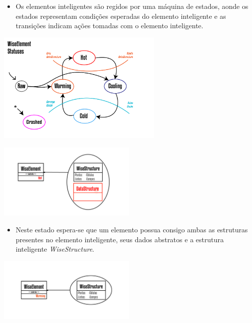\documentclass[10pt]{beamer}
\theoremstyle{remark}
\theoremstyle{definition}
\begin{document}
\begin{frame}[allowframebreaks]
		\framebreak
		
		\begin{itemize}
			\item Os elementos inteligentes são regidos por uma máquina de estados, aonde os estados representam condições esperadas do elemento inteligente e as transições indicam ações tomadas com o elemento inteligente.
		\end{itemize}
		
		\framebreak
		
		\begin{center}
			\includegraphics[width=0.6\textwidth]{images/WiseElementStatus.png}
		\end{center}
		
		\framebreak
		
		\begin{center}
			\includegraphics[width=0.5\textwidth]{images/WiseElementHot.png}
		\end{center}
		
		\begin{itemize}
			\item 	Neste estado espera-se que um elemento possua consigo ambas as estruturas presentes no elemento inteligente, seus dados abstratos e a estrutura inteligente \textit{WiseStructure}.
		\end{itemize}
		
		\framebreak
		\begin{center}
			\item \includegraphics[width=0.5\textwidth]{images/WiseElementWarming.png}
		\end{center}
		

\end{frame}
\end{document}
